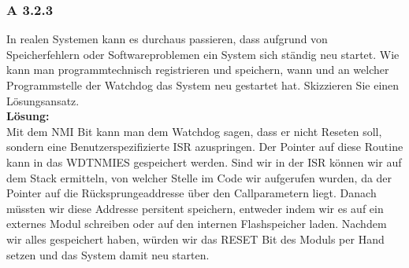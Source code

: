 \subsubsection*{A 3.2.3}
	In realen Systemen kann es durchaus passieren, dass aufgrund von Speicherfehlern oder Softwareproblemen ein System sich ständig neu startet. Wie 
	kann man programmtechnisch registrieren und speichern, wann und an welcher Programmstelle der Watchdog das System neu gestartet hat. Skizzieren Sie 
	einen Lösungsansatz.\\
	
	\textbf{Lösung:}\\
	Mit dem NMI Bit kann man dem Watchdog sagen, dass er nicht Reseten soll, sondern eine Benutzerspezifizierte ISR azuspringen. Der Pointer auf diese Routine kann in das WDTNMIES gespeichert werden. Sind wir in der ISR können wir auf dem Stack ermitteln, von welcher Stelle im Code wir aufgerufen wurden, da der Pointer auf die Rücksprungeaddresse über den Callparametern liegt. Danach müssten wir diese Addresse persitent speichern, entweder indem wir es auf ein externes Modul schreiben oder auf den internen Flashspeicher laden. Nachdem wir alles gespeichert haben, würden wir das RESET Bit des Moduls per Hand setzen und das System damit neu starten.